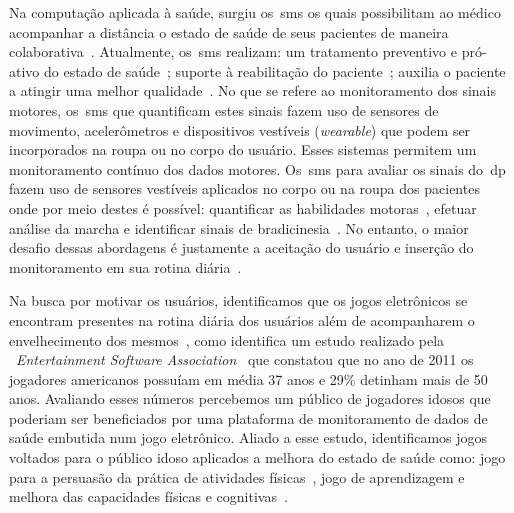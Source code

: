 Na computação aplicada à saúde, surgiu os~\ac{sms} os quais possibilitam ao médico acompanhar a distância o estado de saúde de seus pacientes de maneira colaborativa~\cite{healthmonitoring2013}. Atualmente, os~\ac{sms} realizam: um tratamento preventivo e pró-ativo do estado de saúde~\cite{bardram2010}; suporte à reabilitação do paciente~\cite{sacbespoke2014}; auxilia o paciente a atingir uma melhor qualidade~\cite{sacsvmhms2014}. No que se refere ao monitoramento dos sinais motores, os~\ac{sms} que quantificam estes sinais fazem uso de sensores de movimento, acelerômetros e dispositivos vestíveis (\textit{wearable}) que podem ser incorporados na roupa ou no corpo do usuário. Esses sistemas permitem um monitoramento contínuo dos dados motores. Os~\ac{sms} para avaliar os sinais do~\ac{dp}~\cite{mazilu2015} fazem uso de sensores vestíveis aplicados no corpo ou na roupa dos pacientes onde por meio destes é possível: quantificar as habilidades motoras~\cite{manumeterjbhi2014,patel_monitoring_2009}, efetuar análise da marcha \cite{robotgait2014} e identificar sinais de bradicinesia~\cite{ambulatoryparkinson2010}. No entanto, o maior desafio dessas abordagens é justamente a aceitação do usuário e inserção do monitoramento em sua rotina diária~\cite{alemdar2015}. %

Na busca por motivar os usuários, identificamos que os jogos eletrônicos se encontram presentes na rotina diária dos usuários além de acompanharem o envelhecimento dos mesmos~\cite{moore2011basics}, como identifica um estudo realizado pela ~\textit{Entertainment Software Association}~\cite{esa2011} que constatou que no ano de 2011 os jogadores americanos possuíam em média 37 anos e 29$\%$ detinham mais de 50 anos. Avaliando esses números percebemos um público de jogadores idosos que poderiam ser beneficiados por uma plataforma de monitoramento de dados de saúde embutida num jogo eletrônico. Aliado a esse estudo, identificamos jogos voltados para o público idoso aplicados a melhora do estado de saúde como: jogo para a persuasão da prática de atividades físicas~\cite{brox11}, jogo de aprendizagem e melhora das capacidades físicas e cognitivas~\cite{arntzen2011}. 

